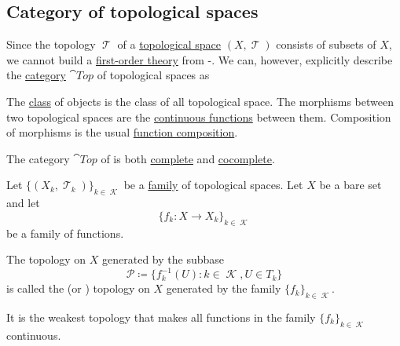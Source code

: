 \subsection{Category of topological spaces}\label{subsec:category_of_topological_spaces}

\begin{definition}\label{def:category_of_small_topological_spaces}
  Since the topology \( \mscrT \) of a \hyperref[def:topological_space]{topological space} \( (X, \mscrT) \) consists of subsets of \( X \), we cannot build a \hyperref[def:first_order_theory]{first-order theory} from -. We can, however, explicitly describe the \hyperref[def:category]{category} \( \cat{Top} \) of topological spaces as
  \begin{refenum}
     The \hyperref[def:set]{class} of objects is the class of all topological space.
     The morphisms between two topological spaces are the \hyperref[def:global_continuity]{continuous functions} between them.
     Composition of morphisms is the usual \hyperref[def:multi_valued_function/composition]{function composition}.
  \end{refenum}
\end{definition}

\begin{theorem}\label{thm:top_complete_cocomplete}
  The category \( \cat{Top} \) of is both \hyperref[def:category_of_cones/limit]{complete} and \hyperref[def:category_of_cones/colimit]{cocomplete}.
\end{theorem}

\begin{definition}\label{def:initial_topology}
  Let \( \{ (X_k, \mscrT_k) \}_{k \in \mscrK} \) be a \hyperref[def:cartesian_product/indexed_family]{family} of topological spaces. Let \( X \) be a bare set and let
  \begin{equation*}
    \{ f_k: X \to X_k \}_{k \in \mscrK}
  \end{equation*}
  be a family of functions.

  The topology on \( X \) generated by the subbase
  \begin{equation*}
    \mathcal{P} \coloneqq \{ f_k^{-1}(U) \colon k \in \mscrK, U \in T_k \}
  \end{equation*}
  is called the  (or ) topology on \( X \) generated by the family \( \{ f_k \}_{k \in \mscrK} \).

  It is the weakest topology that makes all functions in the family \( \{ f_k \}_{k \in \mscrK} \) continuous.
\end{definition}

